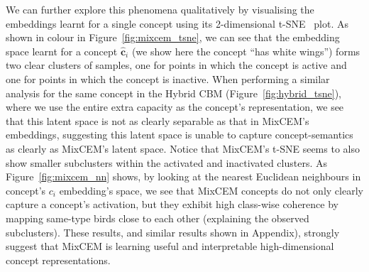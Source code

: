 We can further explore this phenomena qualitatively by visualising the embeddings learnt for a single concept using its 2-dimensional t-SNE~\citep{van2008visualizing} plot.
As shown in colour in Figure~\ref{fig:mixcem_tsne}, we can see that the embedding space learnt for a concept $\hat{\mathbf{c}}_i$ (we show here the concept ``has white wings'') forms two clear clusters of samples, one for points in which the concept is active and one for points in which the concept is inactive. When performing a similar analysis for the same concept in the Hybrid CBM (Figure~\ref{fig:hybrid_tsne}), where we use the entire extra capacity as the concept's representation, we see that this latent space is not as clearly separable as that in MixCEM's embeddings, suggesting this latent space is unable to capture concept-semantics as clearly as MixCEM's latent space. Notice that MixCEM's t-SNE seems to also show smaller subclusters within the activated and inactivated clusters. As Figure~\ref{fig:mixcem_nn} shows, by looking at the nearest Euclidean neighbours in concept's $c_i$ embedding's space, we see that MixCEM concepts do not only clearly capture a concept's activation, but they exhibit high class-wise coherence by mapping same-type birds close to each other (explaining the observed subclusters). These results, and similar results shown in Appendix), strongly suggest that MixCEM is learning useful and interpretable high-dimensional concept representations.



